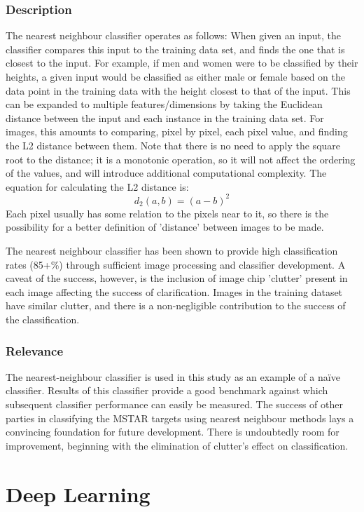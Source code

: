 \subsubsection{Description}
The nearest neighbour classifier operates as follows:
When given an input, the classifier compares this input to the training data set, and finds the one that is closest to the input. For example, if men and women were to be classified by their heights, a given input would be classified as either male or female based on the data point in the training data with the height closest to that of the input. This can be expanded to multiple features/dimensions by taking the Euclidean distance between the input and each instance in the training data set. For images, this amounts to comparing, pixel by pixel, each pixel value, and finding the L2 distance between them. Note that there is no need to apply the square root to the distance; it is a monotonic operation, so it will not affect the ordering of the values, and will introduce additional computational complexity. The equation for calculating the L2 distance is:
\[ d_2(a,b) = (a - b)^2  \]
 Each pixel usually has some relation to the pixels near to it, so there is the possibility for a better definition of 'distance' between images to be made\cite{IMED, Michie94machinelearning}.
 
The nearest neighbour classifier has been shown to provide high classification rates (85+\%) through sufficient image processing and classifier development. A caveat of the success, however, is the inclusion of image chip 'clutter' present in each image affecting the success of clarification. 
Images in the training dataset have similar clutter, and there is a non-negligible contribution to the success of the classification.\cite{Schumacher_atrof}

\subsubsection{Relevance}
The nearest-neighbour classifier is used in this study as an example of a na{\"i}ve classifier. Results of this classifier provide a good benchmark against which subsequent classifier performance can easily be measured. The success of other parties in classifying the MSTAR targets using nearest neighbour methods lays a convincing foundation for future development. There is undoubtedly room for improvement, beginning with the elimination of clutter's effect on classification.


\section{Deep Learning}


